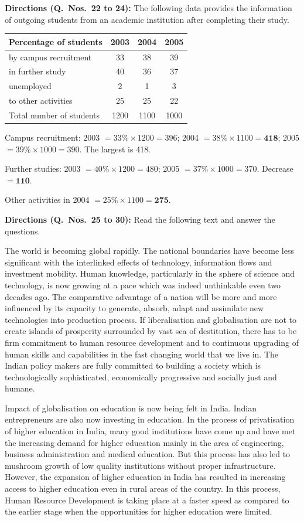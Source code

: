 \textbf{Directions (Q.~Nos.~22 to 24):} The following data provides the information of outgoing students from an academic institution after completing their study.
\begin{center}\small
\begin{tabular}{lccc}\toprule \textbf{Percentage of students} & \textbf{2003} & \textbf{2004} & \textbf{2005}\\\midrule
by campus recruitment & 33 & 38 & 39\\ in further study & 40 & 36 & 37\\ unemployed & 2 & 1 & 3\\ to other activities & 25 & 25 & 22\\\midrule
Total number of students & 1200 & 1100 & 1000\\\bottomrule
\end{tabular}
\end{center}

Campus recruitment: 2003 $=33\%\times1200=396$; 2004 $=38\%\times1100=\mathbf{418}$; 2005 $=39\%\times1000=390$. The largest is 418.

Further studies: 2003 $=40\%\times1200=480$; 2005 $=37\%\times1000=370$. Decrease $=\mathbf{110}$.

Other activities in 2004 $=25\%\times1100=\mathbf{275}$.

\textbf{Directions (Q.~Nos.~25 to 30):} Read the following text and answer the questions.\par\smallskip
The world is becoming global rapidly. The national boundaries have become less significant with the interlinked effects of technology, information flows and investment mobility. Human knowledge, particularly in the sphere of science and technology, is now growing at a pace which was indeed unthinkable even two decades ago. The comparative advantage of a nation will be more and more influenced by its capacity to generate, absorb, adapt and assimilate new technologies into production process. If liberalisation and globalisation are not to create islands of prosperity surrounded by vast sea of destitution, there has to be firm commitment to human resource development and to continuous upgrading of human skills and capabilities in the fast changing world that we live in. The Indian policy makers are fully committed to building a society which is technologically sophisticated, economically progressive and socially just and humane.

Impact of globalisation on education is now being felt in India. Indian entrepreneurs are also now investing in education. In the process of privatisation of higher education in India, many good institutions have come up and have met the increasing demand for higher education mainly in the area of engineering, business administration and medical education. But this process has also led to mushroom growth of low quality institutions without proper infrastructure. However, the expansion of higher education in India has resulted in increasing access to higher education even in rural areas of the country. In this process, Human Resource Development is taking place at a faster speed as compared to the earlier stage when the opportunities for higher education were limited.

